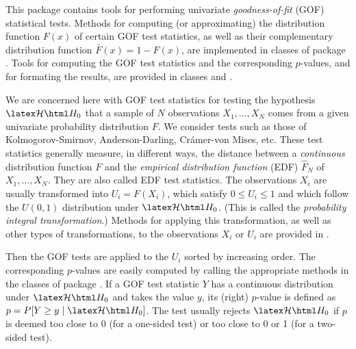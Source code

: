 
This package contains tools for performing
univariate \emph{goodness-of-fit} (GOF) statistical tests.
Methods for computing (or approximating) the distribution
function $F(x)$ of certain GOF test statistics, as well as their
complementary distribution function $\bar F(x) = 1 - F(x)$, are
implemented in classes of package
.
Tools for computing the GOF test statistics and the corresponding
$p$-values, and for formating the results, are provided in classes
 and
.


We are concerned here with GOF test statistics for testing the hypothesis
$\cH_0$ that a sample of $N$ observations
$X_1,\dots,X_N$ comes from a
given univariate probability distribution $F$.
We consider tests such as those of Kolmogorov-Smirnov, Anderson-Darling,
Cr\'amer-von Mises, etc.
These test statistics generally measure, in different ways, the
distance between a {\em continuous\/} distribution function $F$ and
the {\em empirical distribution function\/}
(EDF) $\hat F_N$ of $X_1,\dots,X_N$.
They are also called EDF test statistics.
The observations $X_i$ are usually transformed into $U_i = F (X_i)$,
which satisfy $0\le U_i\le 1$ and which
follow the $U(0,1)$ distribution under $\cH_0$.
(This is called the {\em probability integral transformation}.)
Methods for applying this transformation, as well as other types of
transformations, to the observations $X_i$ or $U_i$
are provided in .

Then the GOF tests are applied to the $U_i$ sorted by increasing order.
The corresponding $p$-values are easily computed by calling the appropriate
methods in the classes of package .
If a GOF test statistic $Y$ has a continuous distribution under
$\cH_0$ and takes the value $y$, its (right) $p$-value is defined as
$p = P[Y \ge y \mid \cH_0]$.  The test usually rejects
$\cH_0$ if $p$
is deemed too close to 0 (for a one-sided test) or too close to 0 or 1
(for a two-sided test).

